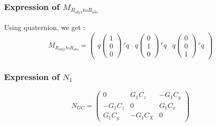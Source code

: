 \subsubsection{Expression of $M_{R_{obj1}toR_{abs}}$}
Using quaternion, we get :
\[M_{R_{obj1}toR_{abs}} = \left(\begin{array}{ccc} q \left(\begin{array}{c}1\\0\\0 \end{array}\right)~^cq & q \left(\begin{array}{c}  0\\1\\0 \end{array}\right)~ ^cq & q \left(\begin{array}{c}  0\\0\\1 \end{array}\right)~ ^cq  \end{array}\right)\]

\subsubsection{Expression of $N_1$}
\[N_{GC}=\left(\begin{array}{ccc} 0&G_1C_z&-G_1C_y\\-G_1C_z&0&G_1C_x\\G_1C_y&-G_1C_X&0\end{array}\right)\]

